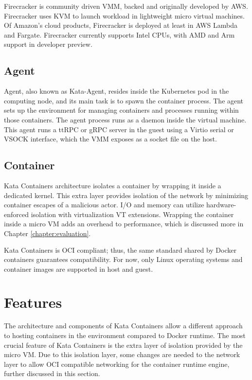 Firecracker is community driven VMM, backed and originally developed by AWS. Firecracker uses KVM to launch workload in lightweight micro virtual machines. Of Amazon's cloud products, Firecracker is deployed at least in AWS Lambda and Fargate. Firecracker currently supports Intel CPUs, with AMD and Arm support in developer preview. \cite{AWS}\cite{FirecrackerDesign}\cite{Debab2021}

\subsection{Agent}

Agent, also known as Kata-Agent, resides inside the Kubernetes pod in the computing node, and its main task is to spawn the container process. The agent sets up the environment for managing containers and processes running within those containers. The agent process runs as a daemon inside the virtual machine. This agent runs a ttRPC or gRPC server in the guest using a Virtio serial or VSOCK interface, which the VMM exposes as a socket file on the host. \cite{KataContainersArchitecture}

\subsection{Container}

Kata Containers architecture isolates a container by wrapping it inside a dedicated kernel. This extra layer provides isolation of the network by minimizing container escapes of a malicious actor. I/O and memory can utilize hardware-enforced isolation with virtualization VT extensions. Wrapping the container inside a micro VM adds an overhead to performance, which is discussed more in Chapter \ref{chapter:evaluation}. \cite{KataContainers}

Kata Containers is OCI compliant; thus, the same standard shared by Docker containers guarantees compatibility. For now, only Linux operating systems and container images are supported in host and guest.

\section{Features}

The architecture and components of Kata Containers allow a different approach to hosting containers in the environment compared to Docker runtime. The most crucial feature of Kata Containers is the extra layer of isolation provided by the micro VM. Due to this isolation layer, some changes are needed to the network layer to allow OCI compatible networking for the container runtime engine, further discussed in this section.

